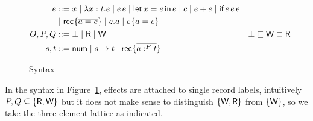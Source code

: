 \documentclass{llncs}
\begin{document}
\begin{figure}[tp]
  \begin{align*}
    e &::= x \mid \lambda x:t.e \mid e\,e \mid \textsf{let}\,x=e\,\textsf{in}\,e  \mid c \mid e+e \mid \textsf{if}\,e\,e\,e\\
      &\mid \textsf{rec}^{{}}\{ \overline{a=e}\} \mid e.a \mid e^{{}}\{a=e\} \\
    O,P,Q &::= \bot \mid \textsf{R} \mid \textsf{W} & \bot & \sqsubseteq\textsf{W}\sqsubset \textsf{R} \\
    s,t &::= \textsf{num} \mid s \to t \mid \textsf{rec}^{{}}\{ \overline{a :^P t}\} \\
  \end{align*}
  \caption{Syntax}
  \label{fig:syntax-3}
\end{figure}
In the syntax in Figure~\ref{fig:syntax-3}, effects are attached to single record labels, intuitively $P, Q \subseteq
\{ \textsf{R}, \textsf{W} \}$ but it does not make sense to distinguish
$\{\textsf{W}, \textsf{R}\}$ from $\{\textsf{W}\}$, so we take the three element lattice as indicated.
\end{document}
